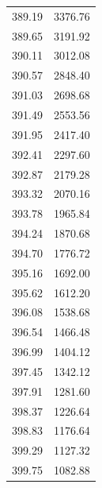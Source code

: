 \begin{table}[!h]
\begin{tabular}{rr}
          389.19 &   3376.76 \\
          389.65 &   3191.92 \\
          390.11 &   3012.08 \\
          390.57 &   2848.40 \\
          391.03 &   2698.68 \\
          391.49 &   2553.56 \\
          391.95 &   2417.40 \\
          392.41 &   2297.60 \\
          392.87 &   2179.28 \\
          393.32 &   2070.16 \\
          393.78 &   1965.84 \\
          394.24 &   1870.68 \\
          394.70 &   1776.72 \\
          395.16 &   1692.00 \\
          395.62 &   1612.20 \\
          396.08 &   1538.68 \\
          396.54 &   1466.48 \\
          396.99 &   1404.12 \\
          397.45 &   1342.12 \\
          397.91 &   1281.60 \\
          398.37 &   1226.64 \\
          398.83 &   1176.64 \\
          399.29 &   1127.32 \\
          399.75 &   1082.88 \\
\bottomrule
\end{tabular}
\end{table}
